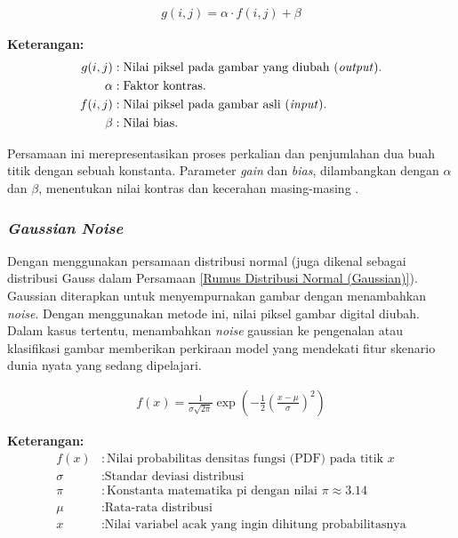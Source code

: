     
    
    \begin{equation}
      \begin{aligned} 
        g(i, j) = \alpha \cdot f(i, j) + \beta
        \end{aligned}\label{Augmentasi Nilai Kontras}
    \end{equation}


    \textbf{Keterangan:}
      \begin{align*}
        g(i, j) & : \text{Nilai piksel pada gambar yang diubah (\textit{output})}. \\
        \alpha & : \text{Faktor kontras}. \\
         f(i, j) & : \text{Nilai piksel pada gambar asli (\textit{input})}.\\
         \beta & : \text{Nilai bias}.\\
    \end{align*}

    Persamaan ini merepresentasikan proses perkalian dan penjumlahan dua buah titik dengan sebuah konstanta. 
    Parameter \textit{gain} dan \textit{bias}, dilambangkan dengan $\alpha$ dan  $\beta$, menentukan nilai kontras 
    dan kecerahan masing-masing \cite{Szeliski2021}.
    
\subsubsection{\textit{Gaussian Noise}}


     Dengan menggunakan persamaan distribusi normal (juga dikenal sebagai distribusi Gauss dalam Persamaan \ref{Rumus Distribusi Normal (Gaussian)}). Gaussian diterapkan untuk menyempurnakan gambar dengan menambahkan \textit{noise}. Dengan menggunakan metode ini, nilai piksel gambar digital diubah. Dalam kasus tertentu, menambahkan \textit{noise} gaussian ke pengenalan atau klasifikasi gambar memberikan perkiraan model yang mendekati fitur skenario dunia nyata yang sedang dipelajari.
 

    \begin{equation}
        \begin{aligned}
            f(x) = \frac{1}{\sigma \sqrt{2\pi}} \exp\left(-\frac{1}{2} \left(\frac{x - \mu}{\sigma}\right)^2\right)
        \end{aligned}\label{Rumus Distribusi Normal (Gaussian)}
    \end{equation}


    \textbf{Keterangan:}
      \begin{align*}
        f(x) & : \text{Nilai probabilitas densitas fungsi (PDF) pada titik } x \\
        \sigma & : \text{Standar deviasi distribusi} \\
        \pi & : \text{Konstanta matematika pi dengan nilai } \pi \approx 3.14\\
        \mu & : \text{Rata-rata distribusi} \\
        x & : \text{Nilai variabel acak yang ingin dihitung probabilitasnya} \\
    \end{align*}
    


